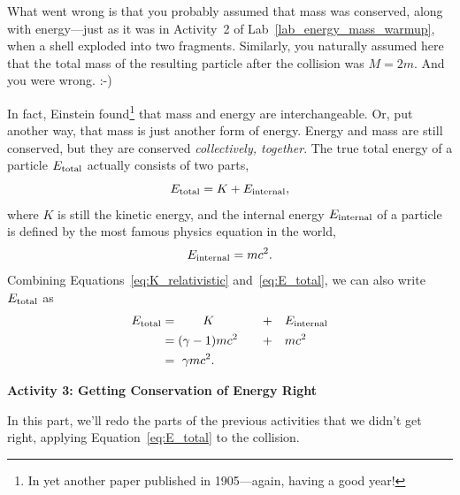 What went wrong is that you probably assumed that mass was conserved, along with energy---just as it was in Activity~2 of Lab~\ref{lab_energy_mass_warmup}, when a shell exploded into two fragments.  Similarly, you naturally assumed here that the total mass of the resulting particle after the collision was $M=2m$.  And you were wrong. :-)

In fact, Einstein found\footnote{In yet another paper published in 1905---again, having a good year!} that mass and energy are interchangeable.  Or, put another way, that mass is just another form of energy.  Energy and mass are still conserved, but they are conserved \textit{collectively, together}.  The true total energy of a particle $E_{\rm total}$ actually consists of two parts,
\begin{equation}
E_{\rm total}=K+E_{\rm internal},
\label{eq:E_total}
\end{equation}
where $K$ is still the kinetic energy, and the internal energy $E_{\rm internal}$ of a particle is defined by the most famous physics equation in the world,
\begin{equation}
E_{\rm internal} = mc^2.
\end{equation}
Combining Equations~\ref{eq:K_relativistic} and~\ref{eq:E_total}, we can also write $E_{\rm total}$ as
\begin{alignat}{3}
E_{\rm total} &=\qquad K & +  \quad & E_{\rm internal} \nonumber \\
& =  (\gamma-1)mc^2 \quad & + \quad & mc^2 \nonumber \\
& = ~ \gamma mc^2.
\end{alignat}


\textbf{Activity 3: Getting Conservation of Energy Right}

In this part, we'll redo the parts of the previous activities that we didn't get right, applying Equation~\ref{eq:E_total} to the collision.

